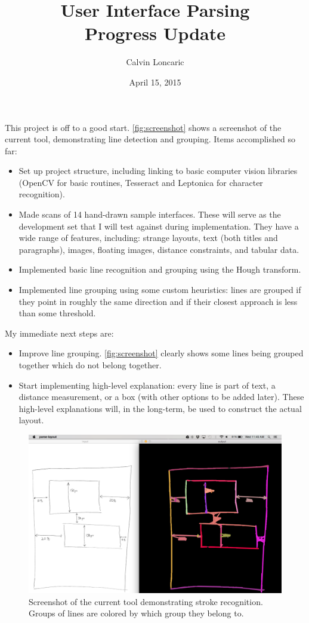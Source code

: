 \documentclass{article}
\title{User Interface Parsing \\ \small{Progress Update}}
\author{Calvin Loncaric}
\date{April 15, 2015}
\begin{document}
\maketitle

\noindent This project is off to a good start. \autoref{fig:screenshot} shows a
screenshot of the current tool, demonstrating line detection and grouping. Items
accomplished so far:
\begin{itemize}
\item Set up project structure, including linking to basic computer vision
    libraries (OpenCV for basic routines, Tesseract and Leptonica for character
    recognition).
\item Made scans of 14 hand-drawn sample interfaces. These will serve as the
    development set that I will test against during implementation. They
    have a wide range of features, including: strange layouts, text (both
    titles and paragraphs), images, floating images, distance constraints,
    and tabular data.
\item Implemented basic line recognition and grouping using the Hough
    transform.
\item Implemented line grouping using some custom heuristics: lines are grouped
    if they point in roughly the same direction and if their closest approach
    is less than some threshold.
\end{itemize}

\noindent My immediate next steps are:
\begin{itemize}
\item Improve line grouping. \autoref{fig:screenshot} clearly shows some lines
    being grouped together which do not belong together.
\item Start implementing high-level explanation: every line is part of text, a
    distance measurement, or a box (with other options to be added later).
    These high-level explanations will, in the long-term, be used to construct
    the actual layout.
\end{itemize}

\begin{figure}
    \includegraphics[width=\textwidth]{progress-2015-04-15-screenshot.png}
    \caption{Screenshot of the current tool demonstrating stroke recognition.
        Groups of lines are colored by which group they belong to.}
    \label{fig:screenshot}
\end{figure}
\end{document}
